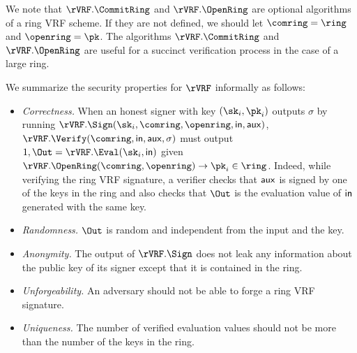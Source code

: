 We note that $ \rVRF.\CommitRing $ and $  \rVRF.\OpenRing $ are optional algorithms of a ring VRF scheme. If they are not defined, we should let $ \comring = \ring $ and $ \openring  = \pk$. The algorithms $ \rVRF.\CommitRing $ and $  \rVRF.\OpenRing $ are useful for a succinct verification process in the case of a large ring.

We summarize the  security properties for $ \rVRF $  informally as follows: 
\begin{itemize}
	\item \emph{Correctness.} When an honest signer with key $ (\sk_i,\pk_i) $ outputs $ \sigma $ by running $ \rVRF.\Sign(\sk_i, \comring,\openring, \msg, \aux) $, $ \rVRF.\Verify(\comring,\msg,\aux,\sigma)  $ must output $ 1,\Out = \rVRF.\Eval(\sk_i, \msg) $ given  $ \rVRF.\OpenRing(\comring,\openring) \rightarrow \pk_i \in \ring$. Indeed, while verifying the ring VRF signature, a verifier checks that $ \mathsf{aux} $ is signed by one of the keys in the ring and also checks that  $ \Out $ is the evaluation value of $ \mathsf{in} $ generated with the same key. 
	\item \emph{Randomness.} $ \Out $ is random and independent from the input and the  key.
	\item   \emph{Anonymity.} The output of $ \rVRF.\Sign $ does not leak any information about the public key of its signer except that it is contained in the ring.
	\item \emph{Unforgeability.} An adversary should not be able to forge a ring VRF signature.
	\item  \emph{Uniqueness.} The number of verified evaluation values should not be more than the number of the keys in the ring. 
\end{itemize}






